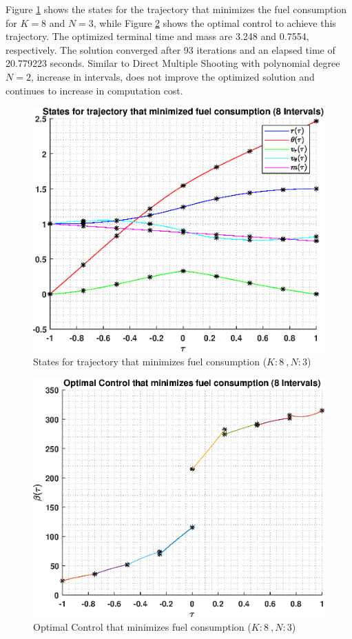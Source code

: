 \documentclass[]{article}
\begin{document}
\vspace{2mm}\newline 
Figure \ref{fig:directStatesK8Poly3} shows the states for the trajectory that minimizes the fuel consumption for \(K = 8\) and  \(N = 3\), while Figure \ref{fig:directControlK8Poly3} shows the optimal control to achieve this trajectory. The optimized terminal time and mass are 3.248 and 0.7554, respectively. The solution converged after 93 iterations and an elapsed time of 20.779223 seconds. Similar to Direct Multiple Shooting with polynomial degree \(N = 2\), increase in intervals, does not improve the optimized solution and continues to increase in computation cost.
\begin{figure}
	\centering
	\includegraphics[scale=0.75]{directStatesK8Poly3.eps}
	\caption{States for trajectory that minimizes fuel consumption (\(K:8\ , N:3\))}
	\label{fig:directStatesK8Poly3}
\end{figure}
\begin{figure}
	\centering
	\includegraphics[scale=0.75]{directControlK8Poly3.eps}
	\caption{Optimal Control that minimizes fuel consumption (\(K:8\ , N:3\))}
	\label{fig:directControlK8Poly3}
\end{figure}
\end{document}

